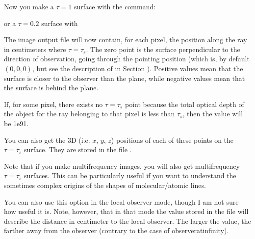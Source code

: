 \documentclass[letterpaper,10pt,english]{sphinxmanual}
\begin{document}
Now you make a \(\tau=1\) surface with the command:

\begin{sphinxVerbatim}[commandchars=\\\{\}]
        
\end{sphinxVerbatim}

or a \(\tau=0.2\) surface with

\begin{sphinxVerbatim}[commandchars=\\\{\}]
        
\end{sphinxVerbatim}

The image output file  will now contain, for each pixel, the
position along the ray in centimeters where \(\tau=\tau_s\). The zero point
is the surface perpendicular to the direction of observation, going through the
pointing position (which is, by default \((0,0,0)\), but see the description
of  in Section {\hyperref[\detokenize{imagesspectra:sec-images}]{}}). Positive values mean that the
surface is closer to the observer than the plane, while negative values mean
that the surface is behind the plane.

If, for some pixel, there exists no \(\tau=\tau_s\) point because the total
optical depth of the object for the ray belonging to that pixel is less than
\(\tau_s\), then the value will be \sphinxhyphen{}1e91.

You can also get the 3\sphinxhyphen{}D (i.e. \(x\), \(y\), \(z\)) positions of
each of these points on the \(\tau=\tau_s\) surface. They are stored in the
file .

Note that if you make multi\sphinxhyphen{}frequency images, you will also get multi\sphinxhyphen{}frequency
\(\tau=\tau_s\) surfaces. This can be particularly useful if you want to
understand the sometimes complex origins of the shapes of molecular/atomic
lines.

You can also use this option in the local observer mode, though I am not sure
how useful it is. Note, however, that in that mode the value stored in the
 file will describe the distance in centimeter to the local
observer. The larger the value, the farther away from the observer (contrary to
the case of observer\sphinxhyphen{}at\sphinxhyphen{}infinity).
\end{document}
